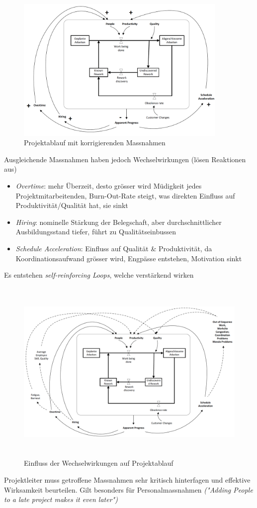 \documentclass[a4paper]{article}
\begin{document}
		\begin{figure}[!htb]
			\centering
			\includegraphics[height=7cm]{img/pm/dynamik_02.png}
			\caption{Projektablauf mit korrigierenden Massnahmen}
			\label{fig:pm_dynamik_02}
		\end{figure}
	
\newpage
		\noindent
	 	Ausgleichende Massnahmen haben jedoch Wechselwirkungen (lösen Reaktionen aus)
	 	\begin{itemize}
	 		\item \textit{Overtime}: mehr Überzeit, desto grösser wird Müdigkeit jedes Projektmitarbeitenden, Burn-Out-Rate steigt, was direkten Einfluss auf Produktivität/Qualität hat, sie sinkt
	 		\item \textit{Hiring}: nominelle Stärkung der Belegschaft, aber durchschnittlicher Ausbildungsstand tiefer, führt zu Qualitätseinbussen
	 		\item \textit{Schedule Acceleration}: Einfluss auf Qualität \& Produktivität, da Koordinationsaufwand grösser wird, Engpässe entstehen, Motivation sinkt
	 	\end{itemize}
 		Es entstehen \textit{self-reinforcing Loops}, welche verstärkend wirken
 		
 		\begin{figure}[!htb]
 			\centering
 			\includegraphics[height=9cm]{img/pm/dynamik_03.png}
 			\caption{Einfluss der Wechselwirkungen auf Projektablauf}
 			\label{fig:pm_dynamik_03}
 		\end{figure}
		\noindent
		Projektleiter muss getroffene Massnahmen sehr kritisch hinterfagen und effektive Wirksamkeit beurteilen.
		Gilt besonders für Personalmassnahmen \textit{("Adding People to a late project makes it even later")}
	
\end{document}
